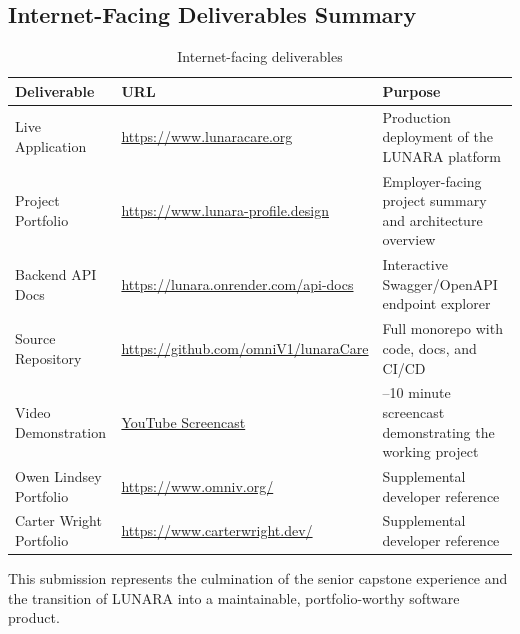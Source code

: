 \documentclass[12pt,letterpaper]{article}
\begin{document}
\subsection{Internet-Facing Deliverables Summary}

\begin{table}[H]
\centering
\small
\begin{tabularx}{\textwidth}{|>{\raggedright\arraybackslash}p{3.5cm}|>{\raggedright\arraybackslash}p{5cm}|>{\raggedright\arraybackslash}X|}
\hline
\rowcolor{TableHeader}\textcolor{TableHeaderText}{\textbf{Deliverable}} & \textcolor{TableHeaderText}{\textbf{URL}} & \textcolor{TableHeaderText}{\textbf{Purpose}} \\
\hline
Live Application & \url{https://www.lunaracare.org} & Production deployment of the LUNARA platform \\
\hline
\rowcolor{TableRowAlt}
Project Portfolio & \url{https://www.lunara-profile.design} & Employer-facing project summary and architecture overview \\
\hline
Backend API Docs & \url{https://lunara.onrender.com/api-docs} & Interactive Swagger/OpenAPI endpoint explorer \\
\hline
\rowcolor{TableRowAlt}
Source Repository & \url{https://github.com/omniV1/lunaraCare} & Full monorepo with code, docs, and CI/CD \\
\hline
Video Demonstration & \href{https://www.youtube.com/watch?v=EY6ncwOMFUQ}{YouTube Screencast} & 5--10 minute screencast demonstrating the working project \\
\hline
\rowcolor{TableRowAlt}
Owen Lindsey Portfolio & \url{https://www.omniv.org/} & Supplemental developer reference \\
\hline
Carter Wright Portfolio & \url{https://www.carterwright.dev/} & Supplemental developer reference \\
\hline
\end{tabularx}
\caption{Internet-facing deliverables}
\end{table}

\vspace{1em}

This submission represents the culmination of the senior capstone experience and the transition of LUNARA into a maintainable, portfolio-worthy software product.

\newpage

\end{document}
